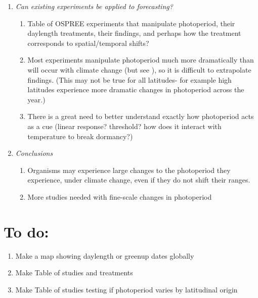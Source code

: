 \documentclass{article}
\begin{document}
\begin{enumerate}
\begin{enumerate}
\end{enumerate}
\item\textit{Can existing experiments be applied to forecasting?}
\begin{enumerate}
\item Table of OSPREE experiments that manipulate photoperiod, their daylength treatments, their findings, and perhaps how the treatment corresponds to spatial/temporal shifts?
\item Most experiments manipulate photoperiod much more dramatically than will occur with climate change (but see \citep{basler2012}), so it is difficult to extrapolate findings. (This may not be true for all latitudes- for example high latitudes experience more dramatic changes in photoperiod across the year.)
\item There is a great need to better understand exactly how photoperiod acts as a cue (linear response? threshold? how does it interact with temperature to break dormancy?)
\end{enumerate}
\item\textit{Conclusions}
\begin{enumerate}
\item Organisms may experience large changes to the photoperiod they experience, under climate change, even if they do not shift their ranges.
\item More studies needed with fine-scale changes in photoperiod
\end{enumerate}
\end{enumerate}

\section* {To do:}
\begin{enumerate}
\item Make a map showing daylength or greenup dates globally 
\item Make Table of studies and treatments
\item Make Table of studies testing if photoperiod varies by latitudinal origin
\end{enumerate}

\clearpage
\end{document}
